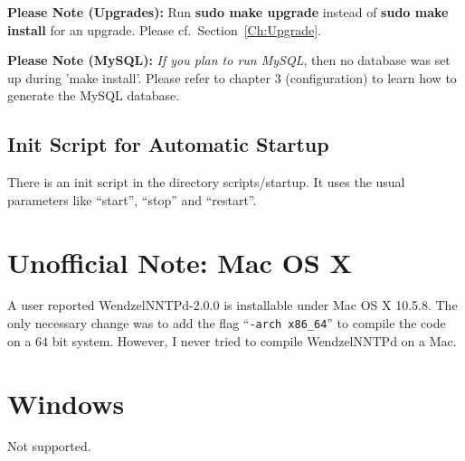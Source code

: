 \textbf{Please Note (Upgrades):} Run \textbf{sudo make upgrade} instead of \textbf{sudo make install} for an upgrade. Please cf.\ Section~\ref{Ch:Upgrade}.

\textbf{Please Note (MySQL):} \textit{If you plan to run MySQL}, then no database was set up during 'make install'. Please refer to chapter 3 (configuration) to learn how to generate the MySQL database.

\subsection{Init Script for Automatic Startup}

There is an init script in the directory scripts/startup. It uses the usual parameters like ``start'', ``stop'' and ``restart''.

\section{Unofficial Note: Mac OS X}

A user reported WendzelNNTPd-2.0.0 is installable under Mac OS X 10.5.8. The only necessary change was to add the flag ``\texttt{-arch x86\_64}'' to compile the code on a 64 bit system. However, I never tried to compile WendzelNNTPd on a Mac.

\section{Windows}

Not supported.


